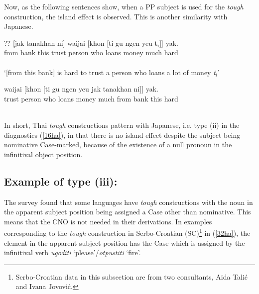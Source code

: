 \documentclass[output=paper,colorlinks,citecolor=brown,
]{langscibook}
\begin{document}
Now, as the following sentences show, when a PP subject is used for the \textit{tough} construction, the island effect is observed. This is another similarity with Japanese.

\begin{exe}
\ex \label{31ha}
\begin{xlist}
\ex \label{31aha}
\gll ?? [jak tanakhan ni]  waijai [khon [ti gu ngen yeu t$_{i}$]]  yak.\\
{} from bank this trust person who loans money much {} hard\\\\
‘[from this bank] is hard to trust a person who loans a lot of money \textit{t$_{i}$}’

\ex \label{31bha}
\gll waijai [khon  [ti gu ngen yeu jak tanakhan ni]] yak.\\
trust person who loans money much from bank this hard\\\\


\end{xlist}
\end{exe}

In short, Thai \textit{tough} constructions pattern with Japanese, i.e. type (ii) in the diagnostics (\ref{16ha}), in that there is no island effect despite the subject being nominative Case-marked, because of the existence of a null pronoun in the infinitival object position.  

\subsection{Example of type (iii): } \label{s3.4ha}
The survey found that some languages have \textit{tough} constructions with the noun in the apparent subject position being assigned a Case other than nominative. This means that the CNO is not needed in their derivations. In examples corresponding to the \textit{tough} construction in Serbo-Croatian (SC)\footnote{Serbo-Croatian data in this subsection are from two consultants, Aida Talić and Ivana Jovović.}  in (\ref{32ha}), the element in the apparent subject position has the Case which is assigned by the infinitival verb \textit{ugoditi} ‘please’/\textit{otpustiti} ‘fire’. 
\end{document}
